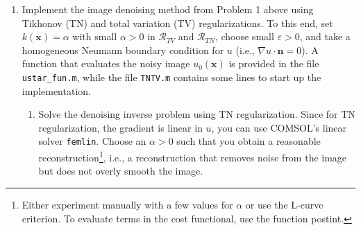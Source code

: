 \documentclass[12pt]{article}
\newcommand{\bs}{\boldsymbol}
\begin{document}
\begin{enumerate}
\begin{enumerate}
{\bf HINTS:}
\begin{itemize}
\item [-] A mesh for the unit circle is provided in the file \verb+circle.xml+. You can load the mesh in FEniCS using the command
\begin{verbatim}
mesh = Mesh("circle.xml")
\end{verbatim}
\item [-] To define the conductivity tensor ${\bs A}({\bs x})$ use the commands
\begin{verbatim}
A1 = Expression((("10", "0"),("0", "10")))
A2 = Expression((("1", "-5"),("-5", "100")))
\end{verbatim}
\end{itemize}

\end{enumerate}


\item
Implement the image denoising method from Problem 1 above using
Tikhonov (TN) and total variation (TV) regularizations. To this end,
set $k(\boldsymbol{x})=\alpha$ with small $\alpha>0$ in
$\mathcal{R}_{TV}$ and $\mathcal{R}_{TN}$, choose small $\varepsilon
>0$, and take a homogeneous Neumann boundary condition for $u$ (i.e.,
$\nabla u \cdot \bs{n} = 0$).  A function that evaluates the noisy
image $u_0(\bs{x})$ is provided in the file \verb+ustar_fun.m+, while
the file \verb+TNTV.m+ contains some lines to start up the
implementation.
\begin{enumerate}

\item Solve the denoising inverse problem using TN
  regularization. Since for TN regularization, the gradient is linear
  in $u$, you can use COMSOL's linear solver \verb+femlin+. Choose an
  $\alpha>0$ such that you obtain a reasonable
  reconstruction\footnote{Either experiment manually with a few values
    for $\alpha$ or use the L-curve criterion. To evaluate terms in
    the cost functional, use the function {\ttfamily postint}.}, i.e.,
  a reconstruction that removes noise from the image but  does not
  overly smooth the image.


\end{enumerate}
\end{enumerate}
\end{document}

